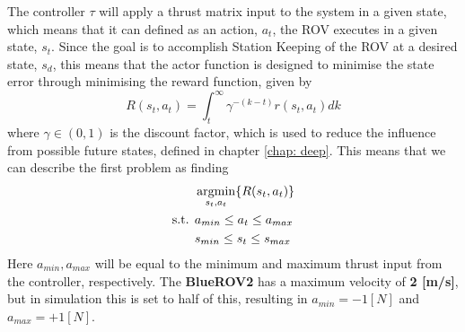 The controller $\tau$ will apply a thrust matrix input to the system in a given state, which means that it can defined as an action, $a_{t}$, the ROV executes in a given state, $s_{t}$. Since the goal is to accomplish Station Keeping of the ROV at a desired state, ${s}_{d}$, this means that the actor function is designed to minimise the state error through minimising the reward function, given by
\begin{equation}
    R(s_{t}, a_{t}) = \int_{t}^{\infty} \gamma^{-(k-t)}r(s_{t},a_{t})dk
\end{equation}
where $\gamma \in (0, 1)$ is the discount factor, which is used to reduce the influence from possible future states, defined in chapter \ref{chap: deep}. This means that we can describe the first problem as finding
\begin{align}
    & \operatorname*{argmin}_{s_{t}, a_{t}} \{ R(s_{t}, a_{t})\} \\
    \text{s.t. } & a_{min} \leq a_{t} \leq a_{max} \\
    & s_{min} \leq s_{t} \leq s_{max}
\end{align}
Here $a_{min}, a_{max}$ will be equal to the minimum and maximum thrust input from the controller, respectively. The \textbf{BlueROV2} has a maximum velocity of \textbf{2 [m/s]}, but in simulation this is set to half of this, resulting in $a_{min} = -1 [N]$ and $a_{max} = +1 [N]$.
